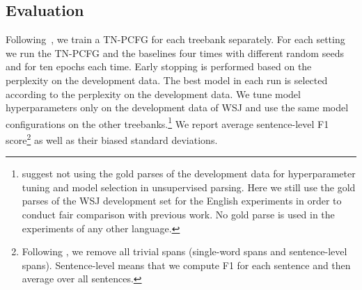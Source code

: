 \documentclass[11pt]{article}
\begin{document}
\subsection{Evaluation}
Following~\citet{kim-etal-2019-compound}, we train a TN-PCFG for each treebank separately.
For each setting we run the TN-PCFG and the baselines four times with different random seeds and for ten epochs each time.
Early stopping is performed based on the perplexity on the development data.
The best model in each run is selected according to the perplexity on the development data.
We tune model hyperparameters only on the development data of WSJ and use the same model configurations on the other treebanks.\footnote{
\citet{shi-etal-2020-role} suggest not using the gold parses of the development data for hyperparameter tuning and model selection in unsupervised parsing.
Here we still use the gold parses of the WSJ development set for the English experiments in order to conduct fair comparison with previous work. No gold parse is used in the experiments of any other language.
}
We report average sentence-level F1 score\footnote{Following \citet{kim-etal-2019-compound}, we remove all trivial spans (single-word spans and sentence-level spans). Sentence-level means that we compute F1 for each sentence and then average over all sentences. } as well as their biased standard deviations.
\end{document}
